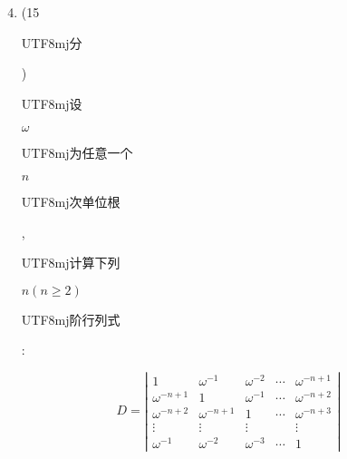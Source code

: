 \documentclass[10pt]{article}
\begin{document}
\begin{enumerate}
  \setcounter{enumi}{3}
  \item (15 \begin{CJK}{UTF8}{mj}分\end{CJK}) \begin{CJK}{UTF8}{mj}设\end{CJK} $\omega$ \begin{CJK}{UTF8}{mj}为任意一个\end{CJK} $n$ \begin{CJK}{UTF8}{mj}次单位根\end{CJK}, \begin{CJK}{UTF8}{mj}计算下列\end{CJK} $n(n \geq 2)$ \begin{CJK}{UTF8}{mj}阶行列式\end{CJK}:
\end{enumerate}
$$
D=\left|\begin{array}{ccccc}
1 & \omega^{-1} & \omega^{-2} & \cdots & \omega^{-n+1} \\
\omega^{-n+1} & 1 & \omega^{-1} & \cdots & \omega^{-n+2} \\
\omega^{-n+2} & \omega^{-n+1} & 1 & \cdots & \omega^{-n+3} \\
\vdots & \vdots & \vdots & & \vdots \\
\omega^{-1} & \omega^{-2} & \omega^{-3} & \cdots & 1
\end{array}\right|
$$
\end{document}
